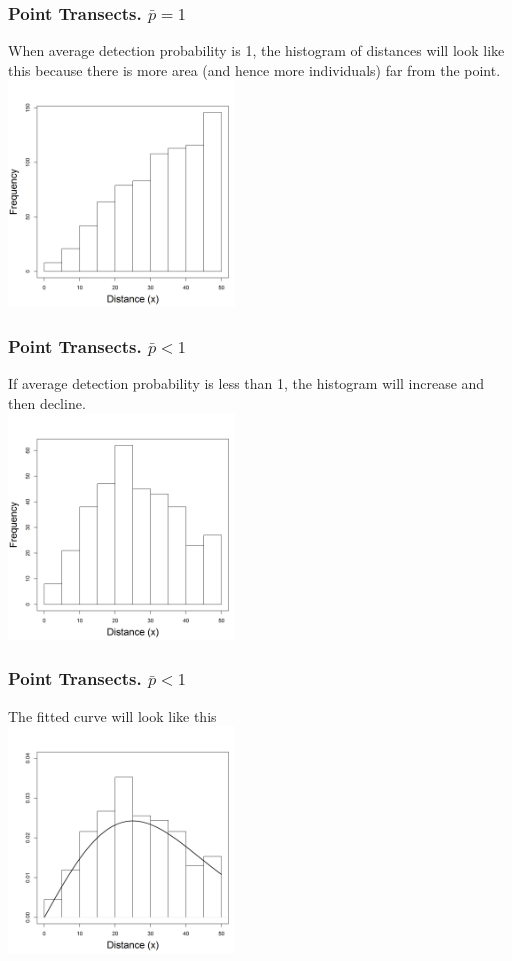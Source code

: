 \documentclass[color=usenames,dvipsnames]{beamer}\usepackage[]{graphicx}\usepackage[]{color}
\begin{document}
\begin{frame}
  \frametitle{Point Transects. $\bar{p}=1$}
  \centering
  When average detection probability is 1, the histogram of distances
  will look like this because there is more area (and hence more
  individuals) far from the point. \\
  \includegraphics[width=6cm]{figs/detfun5} \\
\end{frame}




\begin{frame}
  \frametitle{Point Transects. $\bar{p} < 1$}
\begin{center}
  If average detection probability is less than 1, the histogram will
  increase and then decline. \\
  \includegraphics[width=6cm]{figs/detfun6}
\end{center}
\end{frame}




\begin{frame}
  \frametitle{Point Transects. $\bar{p} < 1$}
\begin{center}
  The fitted curve will look like this \\
  \includegraphics[width=6cm]{figs/detfun7}
\end{center}
\end{frame}
\end{document}

